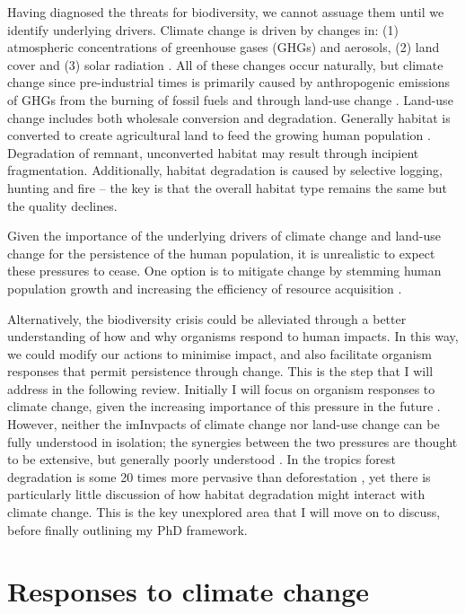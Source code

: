 \documentclass[12pt,a4paper,]{report}
\theoremstyle{definition}
\theoremstyle{definition}
\theoremstyle{definition}
\theoremstyle{remark}
\begin{document}
Having diagnosed the threats for biodiversity, we cannot assuage them
until we identify underlying drivers. Climate change is driven by
changes in: (1) atmospheric concentrations of greenhouse gases (GHGs)
and aerosols, (2) land cover and (3) solar radiation
\citep{ipcc_climate_2013}. All of these changes occur naturally, but
climate change since pre-industrial times is primarily caused by
anthropogenic emissions of GHGs from the burning of fossil fuels and
through land-use change \citep{ipcc_climate_2013}. Land-use change
includes both wholesale conversion and degradation. Generally habitat is
converted to create agricultural land to feed the growing human
population \citep{foley_solutions_2011, godfray_food_2010}. Degradation
of remnant, unconverted habitat may result through incipient
fragmentation. Additionally, habitat degradation is caused by selective
logging, hunting and fire -- the key is that the overall habitat type
remains the same but the quality declines.

Given the importance of the underlying drivers of climate change and
land-use change for the persistence of the human population, it is
unrealistic to expect these pressures to cease. One option is to
mitigate change by stemming human population growth and increasing the
efficiency of resource acquisition \citep{godfray_food_2010}.

Alternatively, the biodiversity crisis could be alleviated through a
better understanding of how and why organisms respond to human impacts.
In this way, we could modify our actions to minimise impact, and also
facilitate organism responses that permit persistence through change.
This is the step that I will address in the following review. Initially
I will focus on organism responses to climate change, given the
increasing importance of this pressure in the future
\citep{sala_global_2000}. However, neither the imInvpacts of climate
change nor land-use change can be fully understood in isolation; the
synergies between the two pressures are thought to be extensive, but
generally poorly understood
\citep{brodie_climate_2012, mantyka-pringle_interactions_2012}. In the
tropics forest degradation is some 20 times more pervasive than
deforestation \citep{asner_contemporary_2009}, yet there is particularly
little discussion of how habitat degradation might interact with climate
change. This is the key unexplored area that I will move on to discuss,
before finally outlining my PhD framework.

\section{Responses to climate change}\label{responses-to-climate-change}
\end{document}
